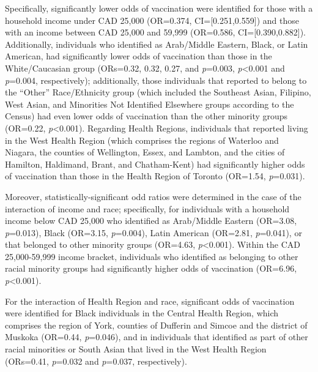 \documentclass[
  letterpaper,
  DIV=11,
  numbers=noendperiod]{scrartcl}
\begin{document}
Specifically, significantly lower odds of vaccination were identified
for those with a household income under CAD 25,000 (OR=0.374,
CI={[}0.251,0.559{]}) and those with an income between CAD 25,000 and
59,999 (OR=0.586, CI={[}0.390,0.882{]}). Additionally, individuals who
identified as Arab/Middle Eastern, Black, or Latin American, had
significantly lower odds of vaccination than those in the
White/Caucasian group (ORs=0.32, 0.32, 0.27, and \emph{p}=0.003,
\emph{p}\textless0.001 and \emph{p}=0.004, respectively); additionally,
those individuals that reported to belong to the ``Other''
Race/Ethnicity group (which included the Southeast Asian, Filipino, West
Asian, and Minorities Not Identified Elsewhere groups according to the
Census) had even lower odds of vaccination than the other minority
groups (OR=0.22, \emph{p}\textless0.001). Regarding Health Regions,
individuals that reported living in the West Health Region (which
comprises the regions of Waterloo and Niagara, the counties of
Wellington, Essex, and Lambton, and the cities of Hamilton, Haldimand,
Brant, and Chatham-Kent) had significantly higher odds of vaccination
than those in the Health Region of Toronto (OR=1.54, \emph{p}=0.031).

Moreover, statistically-significant odd ratios were determined in the
case of the interaction of income and race; specifically, for
individuals with a household income below CAD 25,000 who identified as
Arab/Middle Eastern (OR=3.08, \emph{p}=0.013), Black (OR=3.15,
\emph{p}=0.004), Latin American (OR=2.81, \emph{p}=0.041), or that
belonged to other minority groups (OR=4.63, \emph{p}\textless0.001).
Within the CAD 25,000-59,999 income bracket, individuals who identified
as belonging to other racial minority groups had significantly higher
odds of vaccination (OR=6.96, \emph{p}\textless0.001).

For the interaction of Health Region and race, significant odds of
vaccination were identified for Black individuals in the Central Health
Region, which comprises the region of York, counties of Dufferin and
Simcoe and the district of Muskoka (OR=0.44, \emph{p}=0.046), and in
individuals that identified as part of other racial minorities or South
Asian that lived in the West Health Region (ORs=0.41, \emph{p}=0.032 and
\emph{p}=0.037, respectively).
\end{document}
